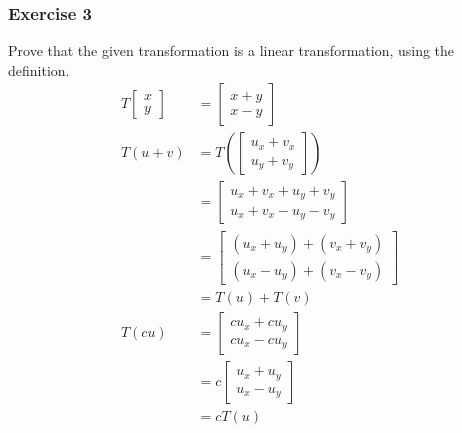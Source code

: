 \documentclass{math}
\begin{document}
\subsubsection*{Exercise 3}
Prove that the given transformation is a linear transformation, using the
definition.
\begin{align*}
  T\begin{bmatrix}x \\ y\end{bmatrix} &=
    \begin{bmatrix}x+y \\ x-y\end{bmatrix} \\
  T(u+v) &= T\left(\begin{bmatrix}
    u_x+v_x \\
    u_y+v_y
  \end{bmatrix}\right) \\
  &= \begin{bmatrix}
    u_x+v_x+u_y+v_y \\
    u_x+v_x-u_y-v_y
  \end{bmatrix} \\
  &= \begin{bmatrix}
    (u_x+u_y)+(v_x+v_y) \\
    (u_x-u_y)+(v_x-v_y)
  \end{bmatrix} \\
  &= T(u)+T(v) \\
  T(cu) &= \begin{bmatrix}
    cu_x+cu_y \\
    cu_x-cu_y
  \end{bmatrix} \\
  &= c\begin{bmatrix}
    u_x+u_y \\
    u_x-u_y
  \end{bmatrix} \\
  &= cT(u)
\end{align*}
\end{document}
